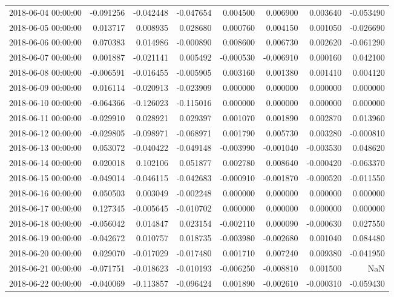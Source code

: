 \begin{tabular}{lrrrrrrr}
2018-06-04 00:00:00 & -0.091256 & -0.042448 & -0.047654 & 0.004500 & 0.006900 & 0.003640 & -0.053490 \\
2018-06-05 00:00:00 & 0.013717 & 0.008935 & 0.028680 & 0.000760 & 0.004150 & 0.001050 & -0.026690 \\
2018-06-06 00:00:00 & 0.070383 & 0.014986 & -0.000890 & 0.008600 & 0.006730 & 0.002620 & -0.061290 \\
2018-06-07 00:00:00 & 0.001887 & -0.021141 & 0.005492 & -0.000530 & -0.006910 & 0.000160 & 0.042100 \\
2018-06-08 00:00:00 & -0.006591 & -0.016455 & -0.005905 & 0.003160 & 0.001380 & 0.001410 & 0.004120 \\
2018-06-09 00:00:00 & 0.016114 & -0.020913 & -0.023909 & 0.000000 & 0.000000 & 0.000000 & 0.000000 \\
2018-06-10 00:00:00 & -0.064366 & -0.126023 & -0.115016 & 0.000000 & 0.000000 & 0.000000 & 0.000000 \\
2018-06-11 00:00:00 & -0.029910 & 0.028921 & 0.029397 & 0.001070 & 0.001890 & 0.002870 & 0.013960 \\
2018-06-12 00:00:00 & -0.029805 & -0.098971 & -0.068971 & 0.001790 & 0.005730 & 0.003280 & -0.000810 \\
2018-06-13 00:00:00 & 0.053072 & -0.040422 & -0.049148 & -0.003990 & -0.001040 & -0.003530 & 0.048620 \\
2018-06-14 00:00:00 & 0.020018 & 0.102106 & 0.051877 & 0.002780 & 0.008640 & -0.000420 & -0.063370 \\
2018-06-15 00:00:00 & -0.049014 & -0.046115 & -0.042683 & -0.000910 & -0.001870 & -0.000520 & -0.011550 \\
2018-06-16 00:00:00 & 0.050503 & 0.003049 & -0.002248 & 0.000000 & 0.000000 & 0.000000 & 0.000000 \\
2018-06-17 00:00:00 & 0.127345 & -0.005645 & -0.010702 & 0.000000 & 0.000000 & 0.000000 & 0.000000 \\
2018-06-18 00:00:00 & -0.056042 & 0.014847 & 0.023154 & -0.002110 & 0.000090 & -0.000630 & 0.027550 \\
2018-06-19 00:00:00 & -0.042672 & 0.010757 & 0.018735 & -0.003980 & -0.002680 & 0.001040 & 0.084480 \\
2018-06-20 00:00:00 & 0.029070 & -0.017029 & -0.017480 & 0.001710 & 0.007240 & 0.009380 & -0.041950 \\
2018-06-21 00:00:00 & -0.071751 & -0.018623 & -0.010193 & -0.006250 & -0.008810 & 0.001500 & NaN \\
2018-06-22 00:00:00 & -0.040069 & -0.113857 & -0.096424 & 0.001890 & -0.002610 & -0.000310 & -0.059430 \\

\end{tabular}

